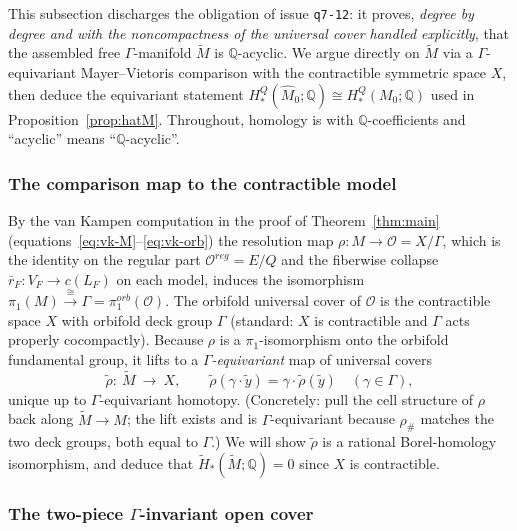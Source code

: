 \documentclass[12pt]{article}
\theoremstyle{definition}
\begin{document}
This subsection discharges the obligation of issue \texttt{q7-12}: it proves,
\emph{degree by degree and with the noncompactness of the universal cover handled
explicitly}, that the assembled free $\Gamma$-manifold $\widetilde M$ is
$\mathbb{Q}$-acyclic. We argue directly on $\widetilde M$ via a $\Gamma$-equivariant
Mayer--Vietoris comparison with the contractible symmetric space $X$, then
deduce the equivariant statement $H^Q_*(\widehat M_0;\mathbb{Q})\cong
H^Q_*(M_0;\mathbb{Q})$ used in Proposition~\ref{prop:hatM}. Throughout, homology is
with $\mathbb{Q}$-coefficients and ``acyclic'' means ``$\mathbb{Q}$-acyclic''.

\subsubsection*{The comparison map to the contractible model}

By the van Kampen computation in the proof of Theorem~\ref{thm:main}
(equations~\eqref{eq:vk-M}--\eqref{eq:vk-orb}) the resolution map
$\rho\colon M\to\mathcal O=X/\Gamma$, which is the identity on the regular part
$\mathcal O^{reg}=E/Q$ and the fiberwise collapse $\bar r_F\colon V_F\to c(L_F)$
on each model, induces the isomorphism $\pi_1(M)\xrightarrow{\cong}\Gamma=
\pi_1^{orb}(\mathcal O)$. The orbifold universal cover of $\mathcal O$ is the
contractible space $X$ with orbifold deck group $\Gamma$ (standard: $X$ is
contractible and $\Gamma$ acts properly cocompactly). Because $\rho$ is a
$\pi_1$-isomorphism onto the orbifold fundamental group, it lifts to a
\emph{$\Gamma$-equivariant} map of universal covers
\begin{equation}\label{eq:liftrho}
   \widetilde\rho\colon\ \widetilde M\ \longrightarrow\ X ,\qquad
   \widetilde\rho(\gamma\cdot \tilde y)=\gamma\cdot\widetilde\rho(\tilde y)
   \quad(\gamma\in\Gamma),
\end{equation}
unique up to $\Gamma$-equivariant homotopy. (Concretely: pull the cell structure
of $\rho$ back along $\widetilde M\to M$; the lift exists and is $\Gamma$-equivariant
because $\rho_\#$ matches the two deck groups, both equal to $\Gamma$.) We will show
$\widetilde\rho$ is a rational Borel-homology isomorphism, and deduce that
$\widetilde H_*(\widetilde M;\mathbb{Q})=0$ since $X$ is contractible.

\subsubsection*{The two-piece $\Gamma$-invariant open cover}
\end{document}
